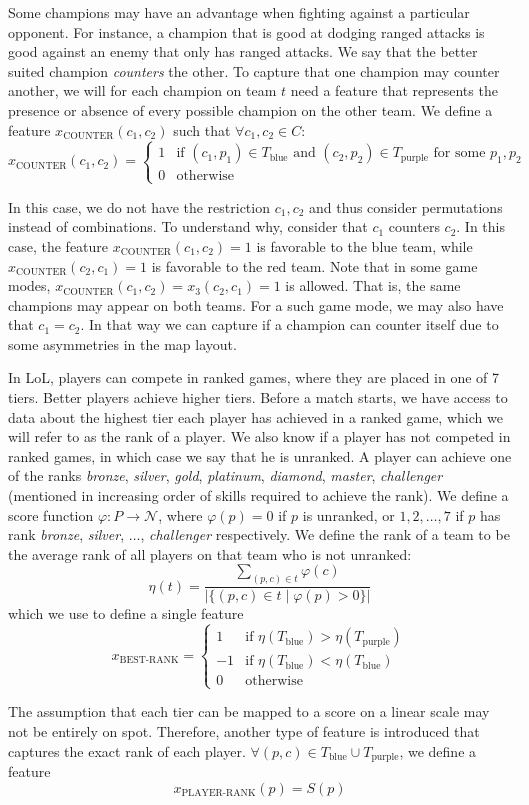 Some champions may have an advantage when fighting against a particular opponent.
For instance, a champion that is good at dodging ranged attacks is good against an enemy that only has ranged attacks.
We say that the better suited champion \emph{counters} the other.
To capture that one champion may counter another, we will for each champion on team $t$ need a feature that represents the presence or absence of every possible champion on the other team.
We define a feature $x_\text{COUNTER}(c_1, c_2)$ such that $\forall c_1, c_2 \in C:$
\[x_\text{COUNTER}(c_1, c_2) = 
\begin{cases} 
1 & \text{if } (c_1, p_1) \in T_\text{blue} \text{ and } (c_2, p_2) \in T_\text{purple} \text{ for some } p_1, p_2 \\ 
0 & \text{otherwise} 
\end{cases}\]

In this case, we do not have the restriction $c_1, c_2$ and thus consider permutations instead of combinations.
To understand why, consider that $c_1$ counters $c_2$.
In this case, the feature $x_\text{COUNTER}(c_1, c_2) = 1$ is favorable to the blue team, while $x_\text{COUNTER}(c_2, c_1) = 1$ is favorable to the red team.
Note that in some game modes, $x_\text{COUNTER}(c_1, c_2) = x_3(c_2, c_1) = 1$ is allowed. That is, the same champions may appear on both teams.
For a such game mode, we may also have that $c_1 = c_2$.
In that way we can capture if a champion can counter itself due to some asymmetries in the map layout.

In LoL, players can compete in ranked games, where they are placed in one of 7 tiers. Better players achieve higher tiers.
Before a match starts, we have access to data about the highest tier each player has achieved in a ranked game, which we will refer to as the rank of a player. We also know if a player has not competed in ranked games, in which case we say that he is unranked.
A player can achieve one of the ranks \textit{bronze}, \textit{silver}, \textit{gold}, \textit{platinum}, \textit{diamond}, \textit{master}, \textit{challenger} (mentioned in increasing order of skills required to achieve the rank).
We define a score function $\varphi : P \rightarrow \mathcal{N}$, where $\varphi(p) = 0$ if $p$ is unranked, or $1, 2, \dots, 7$ if $p$ has rank \textit{bronze}, \textit{silver}, $\dots$, \textit{challenger} respectively.
We define the rank of a team to be the average rank of all players on that team who is not unranked:
\[
\eta(t) = \frac{\sum\limits_{(p, c) \in t} \varphi(c)}{|\{(p, c) \in t \mid \varphi(p) > 0\}|}
\]
which we use to define a single feature
\[
x_\text{BEST-RANK} = 
\begin{cases} 
  1 & \text{if } \eta(T_\text{blue}) > \eta(T_\text{purple})\\
  -1 & \text{if } \eta(T_\text{blue}) < \eta(T_\text{blue})\\
  0 & \text{otherwise} 
\end{cases}
\]

The assumption that each tier can be mapped to a score on a linear scale may not be entirely on spot.
Therefore, another type of feature is introduced that captures the exact rank of each player.
$\forall(p, c) \in T_\text{blue} \cup T_\text{purple}$, we define a feature
\[
x_\text{PLAYER-RANK
}(p) = S(p)
\]